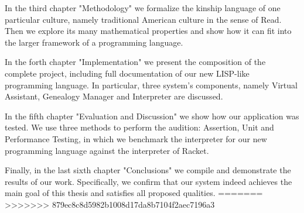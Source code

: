     In the third chapter "Methodology" we formalize the kinship language of one particular culture, namely traditional American
    culture in the sense of Read\cite{read}. Then we explore its many mathematical properties and show how it can fit into the larger
    framework of a programming language.

    In the forth chapter "Implementation" we present the composition of the complete project, including full documentation of our new
    LISP-like programming language. In particular, three system's components, namely Virtual Assistant, Genealogy Manager and
    Interpreter are discussed.

    In the fifth chapter "Evaluation and Discussion" we show how our application was tested. We use three methods to perform the
    audition: Assertion, Unit and Performance Testing, in which we benchmark the interpreter for our new programming language against
    the interpreter of Racket.

    Finally, in the last sixth chapter "Conclusions" we compile and demonstrate the results of our work. Specifically, we confirm that
    our system indeed achieves the main goal of this thesis and satisfies all proposed qualities.
=======
>>>>>>> 879ec8c8d5982b1008d17da8b7104f2aec7196a3
